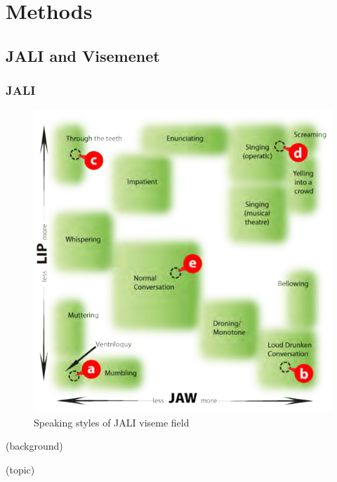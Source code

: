 \documentclass[10pt,twocolumn,letterpaper]{article}
\begin{document}



\section{Methods}

\subsection{JALI and Visemenet}

\subsubsection{JALI}

\begin{figure}
   \includegraphics[width=1.0\linewidth]{jaliStyles}
   
   \caption{Speaking styles of JALI viseme field}
   \label{fig:jaliStyles}
\end{figure}

(background)

(topic)
\end{document}
